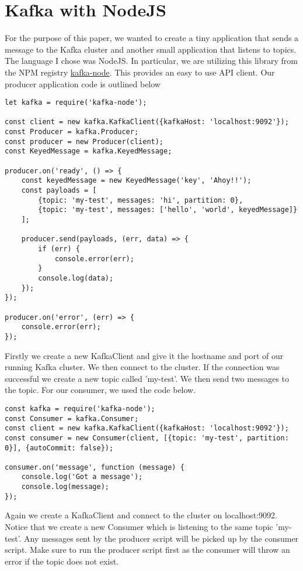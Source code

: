 \section{Kafka with NodeJS}

For the purpose of this paper, we wanted to create a tiny application that sends a message to the Kafka cluster and another small application that listens to topics. The language I chose was NodeJS. In particular, we are utilizing this library from the NPM registry \href{https://www.npmjs.com/package/kafka-node}{kafka-node}. This provides an easy to use API client. Our producer application code is outlined below

\begin{verbatim}
let kafka = require('kafka-node');

const client = new kafka.KafkaClient({kafkaHost: 'localhost:9092'});
const Producer = kafka.Producer;
const producer = new Producer(client);
const KeyedMessage = kafka.KeyedMessage;

producer.on('ready', () => {
    const keyedMessage = new KeyedMessage('key', 'Ahoy!!');
    const payloads = [
        {topic: 'my-test', messages: 'hi', partition: 0},
        {topic: 'my-test', messages: ['hello', 'world', keyedMessage]}
    ];

    producer.send(payloads, (err, data) => {
        if (err) {
            console.error(err);
        }
        console.log(data);
    });
});

producer.on('error', (err) => {
    console.error(err);
});
\end{verbatim}

Firstly we create a new KafkaClient and give it the hostname and port of our running Kafka cluster. We then connect to the cluster. If the connection was successful we create a new topic called 'my-test'. We then send two messages to the topic. For our consumer, we used the code below.

\begin{verbatim}
const kafka = require('kafka-node');
const Consumer = kafka.Consumer;
const client = new kafka.KafkaClient({kafkaHost: 'localhost:9092'});
const consumer = new Consumer(client, [{topic: 'my-test', partition: 0}], {autoCommit: false});

consumer.on('message', function (message) {
    console.log('Got a message');
    console.log(message);
});
\end{verbatim}

Again we create a KafkaClient and connect to the cluster on localhost:9092. Notice that we create a new Consumer which is listening to the same topic 'my-test'. Any messages sent by the producer script will be picked up by the consumer script. Make sure to run the producer script first as the consumer will throw an error if the topic does not exist.